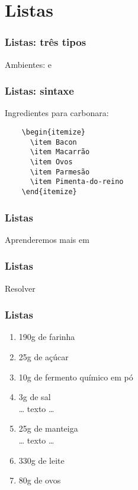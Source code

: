 \section{Listas}

\begin{frame}
  \frametitle{Listas: três tipos}
  \LARGE
  Ambientes:  e 
\end{frame}

\begin{frame}[fragile]
  \frametitle{Listas: sintaxe}
  \LARGE
  Ingredientes para carbonara:

  \begin{verbatim}
    \begin{itemize}
      \item Bacon
      \item Macarrão
      \item Ovos
      \item Parmesão
      \item Pimenta-do-reino
    \end{itemize}
  \end{verbatim}
\end{frame}

\begin{frame}
  \frametitle{Listas}
  \Huge
  Aprenderemos mais em 
\end{frame}

\begin{frame}
  \frametitle{Listas}
  \Huge
  Resolver 
\end{frame}

\begin{frame}
  \frametitle{Listas}
  \large
  \begin{enumerate}[{Ingrediente} 1)]
    \item 190g de farinha
    \item 25g de açúcar
    \item 10g de fermento químico em pó
    \item 3g de sal\\[1em] … texto …\\[1em]
    \item 25g de manteiga\\[1em] … texto …\\[1em]
    \item 330g de leite
    \item 80g de ovos
  \end{enumerate}
\end{frame}

